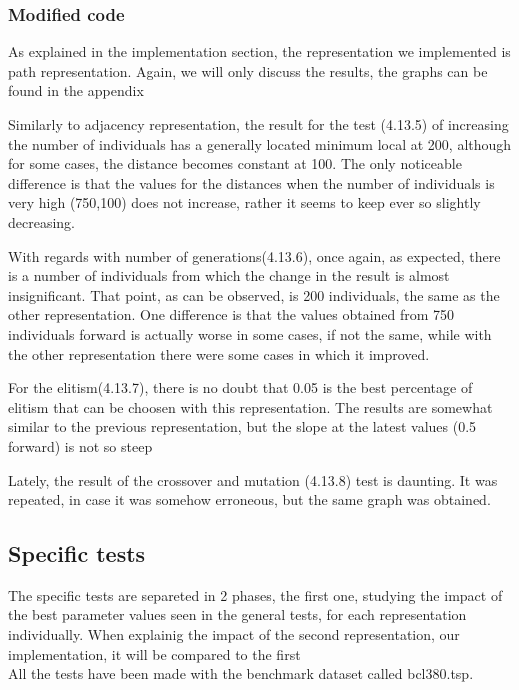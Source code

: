 \subsubsection{Modified code}

As explained in the implementation section, the representation we
implemented is path representation. Again, we will only discuss the
results, the graphs can be found in the appendix

Similarly to adjacency representation, the result for the test (4.13.5)
of increasing the number of individuals has a generally located minimum local at
200, although for some cases, the distance becomes constant at 100. The only
noticeable difference is that the values for the distances when the number of
individuals is very high (750,100) does not increase, rather it seems to keep
ever so slightly decreasing.

With regards with number of generations(4.13.6), once again, as expected, there is a number of individuals from which the
change in the result is almost insignificant. That point, as can be observed, is 200
individuals, the same as the other representation. One difference is that the
values obtained from 750 individuals forward is actually worse in some
cases, if not the same, while with the other representation there were some
cases in which it improved.

For the elitism(4.13.7), there is no doubt that 0.05 is the best
percentage of elitism that can be choosen with this representation. The results
are somewhat similar to the previous representation, but the slope at the
latest values (0.5 forward) is not so steep

Lately, the result of the crossover and mutation (4.13.8)  test is daunting. It was repeated, in case it was somehow erroneous, but the same graph was obtained.
\\

\subsection{Specific tests}

The specific tests are separeted in 2 phases, the first one, studying the impact of the best parameter values seen in the general
tests, for each representation individually. When explainig the impact of the
second representation, our implementation, it will be compared to the first\\
All the tests have been made with the benchmark dataset called bcl380.tsp.

